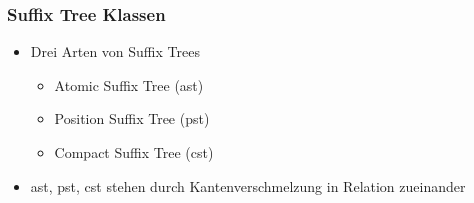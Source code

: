 \documentclass{beamer}
\begin{document}
\begin{frame}
    \frametitle{Suffix Tree Klassen}
    \begin{itemize}
        \item Drei Arten von Suffix Trees
        \begin{itemize}
            \item Atomic Suffix Tree (ast)
            \item Position Suffix Tree (pst)
            \item Compact Suffix Tree (cst)
        \end{itemize}
        \item ast, pst, cst stehen durch Kantenverschmelzung in Relation zueinander 
    \end{itemize}
\end{frame}
\end{document}
